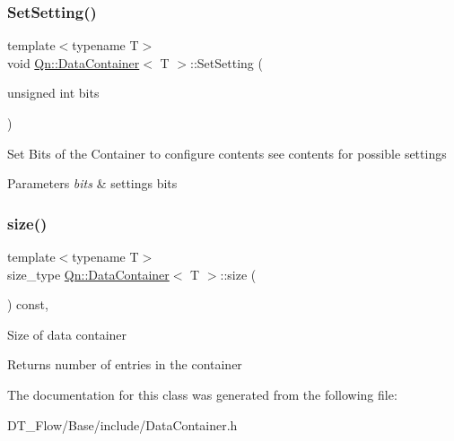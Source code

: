 \subsubsection{\texorpdfstring{Set\+Setting()}{SetSetting()}}
{\footnotesize\ttfamily template$<$typename T$>$ \\
void \mbox{\hyperlink{classQn_1_1DataContainer}{Qn\+::\+Data\+Container}}$<$ T $>$\+::Set\+Setting (\begin{DoxyParamCaption}\item[{unsigned int}]{bits }\end{DoxyParamCaption})\hspace{0.3cm}{\ttfamily [inline]}}

Set Bits of the Container to configure contents see contents for possible settings 
\begin{DoxyParams}{Parameters}
{\em bits} & settings bits \\
\hline
\end{DoxyParams}
\mbox{\label{classQn_1_1DataContainer_a95370695e706347db87491cdd65fcffb}} 
\subsubsection{\texorpdfstring{size()}{size()}}
{\footnotesize\ttfamily template$<$typename T$>$ \\
size\+\_\+type \mbox{\hyperlink{classQn_1_1DataContainer}{Qn\+::\+Data\+Container}}$<$ T $>$\+::size (\begin{DoxyParamCaption}{ }\end{DoxyParamCaption}) const\hspace{0.3cm}{\ttfamily [inline]}, {\ttfamily [noexcept]}}

Size of data container \begin{DoxyReturn}{Returns}
number of entries in the container 
\end{DoxyReturn}


The documentation for this class was generated from the following file\+:\begin{DoxyCompactItemize}
\item 
D\+T\+\_\+\+Flow/\+Base/include/Data\+Container.\+h\end{DoxyCompactItemize}
